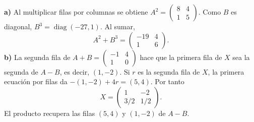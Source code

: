 \textbf{a)} Al multiplicar filas por columnas se obtiene
$A^2=\begin{pmatrix}8&4\\1&5\end{pmatrix}$. Como $B$ es diagonal,
$B^3=\operatorname{diag}(-27,1)$. Al sumar,
\[
\boxed{A^2+B^3=\begin{pmatrix}-19&4\\1&6\end{pmatrix}}.
\]
\textbf{b)} La segunda fila de $A+B=\begin{pmatrix}-1&4\\1&0\end{pmatrix}$
hace que la primera fila de $X$ sea la segunda de $A-B$, es decir,
$(1,-2)$. Si $r$ es la segunda fila de $X$, la primera ecuación
por filas da $-(1,-2)+4r=(5,4)$. Por tanto
\[
\boxed{X=\begin{pmatrix}1&-2\\3/2&1/2\end{pmatrix}}.
\]
El producto recupera las filas $(5,4)$ y $(1,-2)$ de $A-B$.
